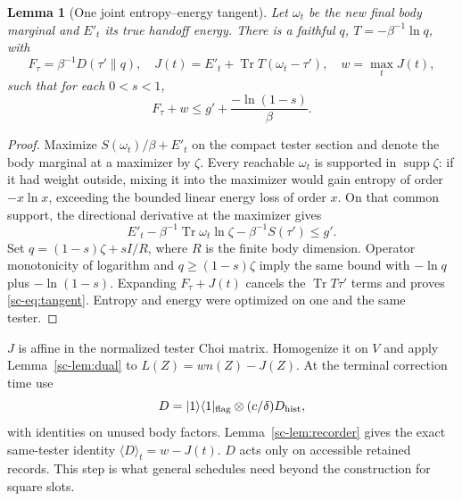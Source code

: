 \documentclass[11pt]{article}
\newtheorem{lemma}[theorem]{Lemma}
\theoremstyle{definition}
\theoremstyle{remark}
\newcommand{\Tr}{\operatorname{Tr}}
\begin{document}
\begin{lemma}[One joint entropy--energy tangent]\label{sc-lem:tangent}
Let $\omega_t$ be the new final body marginal and $E'_t$ its true handoff energy. There is a faithful $q$, $T=-\beta^{-1}\ln q$, with
\[
F_\tau=\beta^{-1}D(\tau'\|q),\quad
J(t)=E'_t+\Tr T(\omega_t-\tau'),\quad w=\max_tJ(t),
\]
such that for each $0<s<1$,
\begin{equation}\label{sc-eq:tangent}
F_\tau+w\le g'+\frac{-\ln(1-s)}\beta.
\end{equation}
\end{lemma}
\begin{proof}
Maximize $S(\omega_t)/\beta+E'_t$ on the compact tester section and denote the body marginal at a maximizer by $\zeta$. Every reachable $\omega_t$ is supported in $\operatorname{supp}\zeta$: if it had weight outside, mixing it into the maximizer would gain entropy of order $-x\ln x$, exceeding the bounded linear energy loss of order $x$. On that common support, the directional derivative at the maximizer gives
\[
E'_t-\beta^{-1}\Tr\omega_t\ln\zeta-\beta^{-1}S(\tau')\le g'.
\]
Set $q=(1-s)\zeta+sI/R$, where $R$ is the finite body dimension. Operator monotonicity of logarithm and $q\ge(1-s)\zeta$ imply the same bound with $-\ln q$ plus $-\ln(1-s)$. Expanding $F_\tau+J(t)$ cancels the $\Tr T\tau'$ terms and proves \eqref{sc-eq:tangent}. Entropy and energy were optimized on one and the same tester.
\end{proof}

$J$ is affine in the normalized tester Choi matrix. Homogenize it on $V$ and apply Lemma~\ref{sc-lem:dual} to $L(Z)=w n(Z)-J(Z)$. At the terminal correction time use
\[
D=|1\rangle\langle1|_{\rm flag}\otimes(c/\delta)D_{\rm hist},
\]
with identities on unused body factors. Lemma~\ref{sc-lem:recorder} gives the exact same-tester identity $\langle D\rangle_t=w-J(t)$. $D$ acts only on accessible retained records. This step is what general schedules need beyond the construction for square slots.
\end{document}
